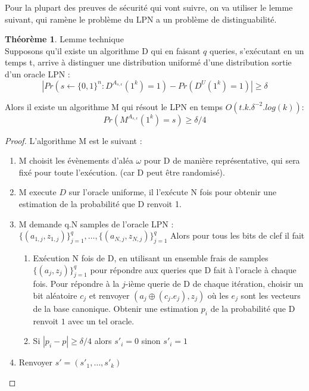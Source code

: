 \documentclass{article}		%
\theoremstyle{definition}
\newtheorem{theo}{Théorème}
\theoremstyle{plain}
\theoremstyle{plain}
\theoremstyle{plain}
\theoremstyle{plain}
\theoremstyle{plain}
\begin{document}
\begin{framed}
Pour la plupart des preuves de sécurité qui vont suivre, on va utiliser
le lemme suivant, qui ramène le problème du LPN a un problème de
distinguabilité.

\begin{theo}Lemme technique \label{lemmetechnique}\\
Supposons qu'il existe un algorithme D qui en faisant $q$ queries,
s'exécutant en un temps t, arrive à distinguer une distribution uniformé
d'une distribution sortie d'un oracle LPN :
$$|Pr(s\leftarrow\{0,1\}^n : D^{A_{s,\epsilon}}(1^k)=1)
-Pr(D^{U}(1^k)=1)|\geq \delta $$

Alors il existe un algorithme M qui résout le LPN en temps
$O(t.k.\delta^{-2}.log(k))$:
$$Pr(M^{A_{s,\epsilon}}(1^k)=s)\geq\delta/4 $$
\end{theo}
\begin{proof}
L'algorithme M est le suivant :
\begin{enumerate}
\item M choisit les évènements d'aléa $\omega$ pour D de manière
représentative, qui sera fixé pour toute
l'exécution. (car D peut être randomisé).
\item M execute $D$ sur l'oracle uniforme, 
il l'exécute N fois pour obtenir une estimation de la probabilité que D
renvoit 1.
\item M demande q.N samples de l'oracle LPN : $\{(a_{1,j},z_{1,j})\}_{j=1}^q,
\dots,\{(a_{N,j},z_{N,j})\}_{j=1}^q$ Alors pour tous les bits de clef il
fait 
\begin{enumerate}
\item Exécution N fois de D, en
utilisant un ensemble frais de samples $\{(a_{j},z_{j})\}_{j=1}^q$ pour
répondre aux
queries que D fait à l'oracle à chaque fois.  Pour répondre à la $j$-ième
querie de D de chaque itération, choisir un bit aléatoire $c_j$ et
renvoyer $(a_j \oplus (c_j.e_j),z_j)$ où les $e_j$ sont les vecteurs de
la base canonique. Obtenir une estimation $p_i$ de la probabilité que D
renvoit $1$ avec un tel oracle.
\item Si $|p_i-p| \geq \delta/4$ alors $s'_i=0$ sinon $s'_i=1$
\end{enumerate}
\item Renvoyer $s'=(s'_1,\dots,s'_k)$
\end{enumerate}


\end{proof}
\end{framed}
\end{document}
